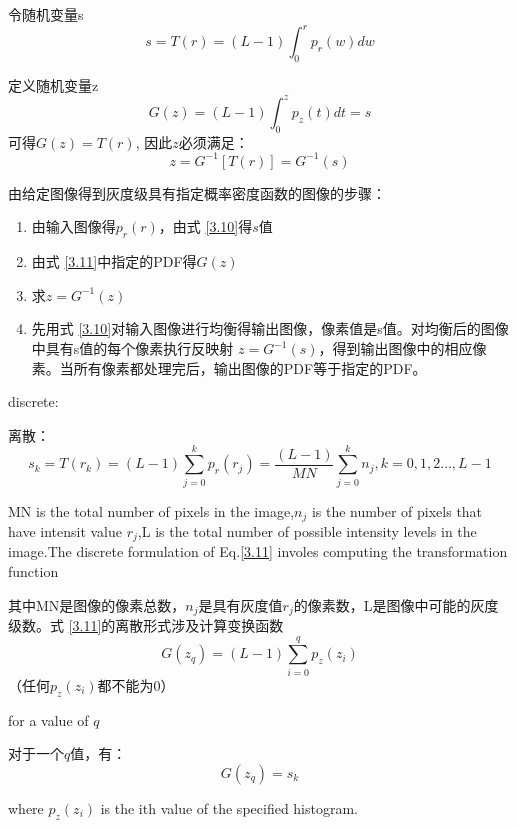 \documentclass[a4paper,12pt]{article}
\numberwithin{equation}{section}%
\begin{document}
令随机变量s
\begin{equation} \label{3.10}  
 s=T(r)=(L-1)\int_{0}^{r}p_{r}(w)dw 
\end{equation}

定义随机变量z
\begin{equation} \label{3.11}   
 G(z)=(L-1)\int_{0}^{z}p_{z}(t)dt=s 
\end{equation}
可得$G(z)=T(r)$, 因此$z$必须满足：
\begin{equation} \label{3.12}   
 z=G^{-1}[T(r)]=G^{-1}(s)
\end{equation}

由给定图像得到灰度级具有指定概率密度函数的图像的步骤：
\begin{enumerate}
\item 由输入图像得$p_{r}(r)$，由式 \ref{3.10}得$s$值
\item 由式 \ref{3.11}中指定的PDF得$G(z)$
\item 求$z=G^{-1}(z)$
\item 先用式 \ref{3.10}对输入图像进行均衡得输出图像，像素值是s值。对均衡后的图像中具有s值的每个像素执行反映射 $z=G^{-1}(s)$，得到输出图像中的相应像素。当所有像素都处理完后，输出图像的PDF等于指定的PDF。
\end{enumerate}

discrete:

离散：
\begin{equation} \label {3.13}
s_{k}=T(r_{k})=(L-1)\sum_{j=0}^{k}p_{r}(r_{j})=\frac{(L-1)}{MN}\sum_{j=0}^{k}{n_{j}},k=0,1,2\ldots,L-1
\end{equation}

MN is the total number of pixels in the image,$n_{j}$ is the number of pixels that have intensit value $r_{j}$,L is the total number of possible intensity levels in the image.The discrete formulation of Eq.\ref{3.11} involes computing the transformation function

其中MN是图像的像素总数，$n_{j}$是具有灰度值$r_{j}$的像素数，L是图像中可能的灰度级数。式 \ref{3.11}的离散形式涉及计算变换函数
\begin{equation} \label {3.14}
G(z_{q})=(L-1)\sum_{i=0}^{q}p_{z}(z_{i})
\end{equation}
（任何$p_{z}(z_{i})$都不能为0）

for a value of $q$

对于一个$q$值，有：
\begin{equation} \label {3.15}
G(z_{q})=s_{k}
\end{equation}

where $p_z(z_{i})$ is the ith value of the specified histogram.
\end{document}
